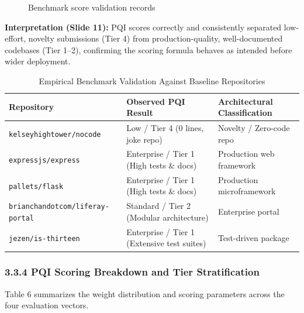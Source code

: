 \documentclass[12pt,a4paper]{article}
\begin{document}
\begin{figure}[h!]
\centering
\vspace{0.3cm}
\vspace{0.3cm}
\caption{Benchmark score validation records}
\end{figure}

\noindent \textbf{Interpretation (Slide 11):} PQI scores correctly and consistently separated low-effort, novelty submissions (Tier 4) from production-quality, well-documented codebases (Tier 1--2), confirming the scoring formula behaves as intended before wider deployment.

\newpage
\thispagestyle{fancy}
\begin{table}[h!]
\centering
\caption{Empirical Benchmark Validation Against Baseline Repositories}
\label{tab:benchmarks}
\small
\begin{tabularx}{\textwidth}{|p{4.5cm}|X|p{3.8cm}|}
\hline
\textbf{Repository} & \textbf{Observed PQI Result} & \textbf{Architectural Classification} \\ \hline
\texttt{kelseyhightower/nocode} & Low / Tier 4 (0 lines, joke repo) & Novelty / Zero-code repo \\ \hline
\texttt{expressjs/express} & Enterprise / Tier 1 (High tests \& docs) & Production web framework \\ \hline
\texttt{pallets/flask} & Enterprise / Tier 1 (High tests \& docs) & Production microframework \\ \hline
\texttt{brianchandotcom/liferay-portal} & Standard / Tier 2 (Modular architecture) & Enterprise portal \\ \hline
\texttt{jezen/is-thirteen} & Enterprise / Tier 1 (Extensive test suites) & Test-driven package \\ \hline
\end{tabularx}
\end{table}

\subsubsection{3.3.4 PQI Scoring Breakdown and Tier Stratification}
Table 6 summarizes the weight distribution and scoring parameters across the four evaluation vectors.
\end{document}
